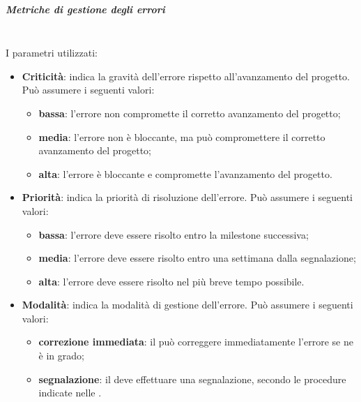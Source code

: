 \subparagraph{Metriche di gestione degli errori}\mbox{}\\
I parametri utilizzati:
\begin{itemize}
	\item \textbf{Criticità}: indica la gravità dell'errore rispetto all'avanzamento del progetto. Può assumere i seguenti valori:
	\begin{itemize}
		\item \textbf{bassa}: l'errore non compromette il corretto avanzamento del progetto;
		\item \textbf{media}: l'errore non è bloccante, ma può compromettere il corretto avanzamento del progetto;
		\item \textbf{alta}: l'errore è bloccante e compromette l'avanzamento del progetto.	
	\end{itemize}
	\item \textbf{Priorità}: indica la priorità di risoluzione dell'errore. Può assumere i seguenti valori:
	\begin{itemize}
		\item \textbf{bassa}: l'errore deve essere risolto entro la milestone successiva;
		\item \textbf{media}: l'errore deve essere risolto entro una settimana dalla segnalazione;
		\item \textbf{alta}: l'errore deve essere risolto nel più breve tempo possibile.
	\end{itemize}
	\item \textbf{Modalità}: indica la modalità di gestione dell'errore. Può assumere i seguenti valori:
	\begin{itemize}
		\item \textbf{correzione immediata}: il \Verificatore{} può correggere immediatamente l'errore se ne è in grado;
		\item \textbf{segnalazione}: il \Verificatore{} deve effettuare una segnalazione, secondo le procedure indicate nelle \NormeDiProgetto{}.
	\end{itemize}
\end{itemize}
